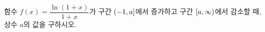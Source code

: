 함수 $f(x)=\dfrac{\ln(1+x)}{1+x}$가 구간 $(-1{,}\mkern3mu\mathopen{}a]$에서 증가하고 구간 $[a{,}\mkern3mu\mathopen{}\infty)$에서 감소할 때, 상수 $a$의 값을 구하시오.
